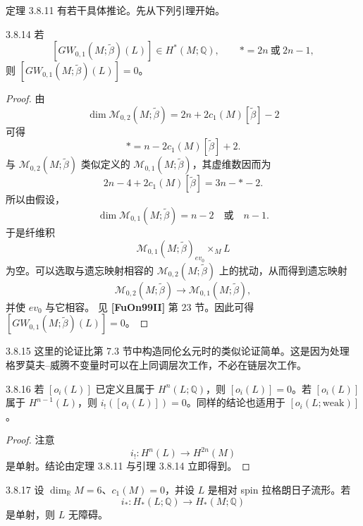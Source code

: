 定理 3.8.11 有若干具体推论。先从下列引理开始。

\begin{lemma}{3.8.14}\label{lem:3-8-14}
若
\[
 [GW_{0,1}(M;\widetilde\beta)(L)]
 \in H^*(M;\mathbb Q),
 \qquad *=2n\ \text{或}\ 2n-1,
\]
则
$[GW_{0,1}(M;\widetilde\beta)(L)]=0$。
\end{lemma}

\begin{proof}
由
\[
 \dim\mathcal M_{0,2}(M;\widetilde\beta)
 =
 2n+2c_1(M)[\widetilde\beta]-2
\]
可得
\[
 *=n-2c_1(M)[\widetilde\beta]+2.
\]
与 $\mathcal M_{0,2}(M;\widetilde\beta)$ 类似定义的
$\mathcal M_{0,1}(M;\widetilde\beta)$，其虚维数因而为
\[
 2n-4+2c_1(M)[\widetilde\beta]
 =
 3n-*-2.
\]
所以由假设，
\[
 \dim\mathcal M_{0,1}(M;\widetilde\beta)
 =n-2\quad\text{或}\quad n-1.
\]
于是纤维积
\[
 \mathcal M_{0,1}(M;\widetilde\beta)_{ev_0}
 \mathbin{\times_M}L
\]
为空。可以选取与遗忘映射相容的
$\mathcal M_{0,2}(M;\widetilde\beta)$ 上的扰动，从而得到遗忘映射
\[
 \mathcal M_{0,2}(M;\widetilde\beta)
 \longrightarrow
 \mathcal M_{0,1}(M;\widetilde\beta),
\]
并使 $ev_0$ 与它相容。
见 \textbf{[FuOn99II]} 第 23 节。因此可得
$[GW_{0,1}(M;\widetilde\beta)(L)]=0$。
\end{proof}

\begin{remark}{3.8.15}\label{rem:3-8-15}
这里的论证比第 7.3 节中构造同伦幺元时的类似论证简单。这是因为处理
格罗莫夫--威腾不变量时可以在上同调层次工作，不必在链层次工作。
\end{remark}

\begin{corollary}{3.8.16}\label{cor:3-8-16}
若 $[o_i(L)]$ 已定义且属于 $H^n(L;\mathbb Q)$，则
$[o_i(L)]=0$。若 $[o_i(L)]$ 属于 $H^{n-1}(L)$，则
$i_!([o_i(L)])=0$。同样的结论也适用于
$[o_i(L;\mathrm{weak})]$。
\end{corollary}

\begin{proof}
注意
\[
 i_!\colon H^n(L)\longrightarrow H^{2n}(M)
\]
是单射。结论由定理 3.8.11 与引理 3.8.14 立即得到。
\end{proof}

\begin{corollary}{3.8.17}\label{cor:3-8-17}
设 $\dim_{\mathbb R}M=6$、$c_1(M)=0$，并设 $L$ 是相对 spin
拉格朗日子流形。若
\[
 i_*\colon H_*(L;\mathbb Q)\longrightarrow H_*(M;\mathbb Q)
\]
是单射，则 $L$ 无障碍。
\end{corollary}

